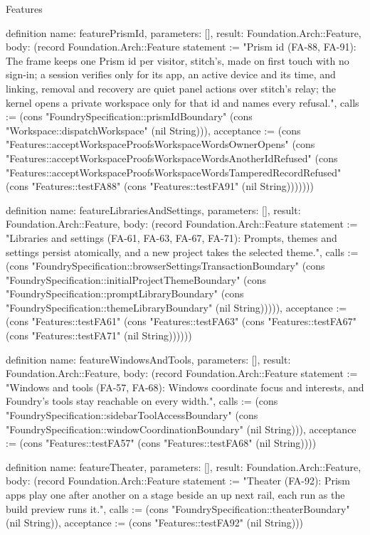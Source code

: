 \begin{lexlean}{Features}
\begin{semanticmodule}
definition{
  name: featurePrismId,
  parameters: [],
  result: Foundation.Arch::Feature,
  body: (record Foundation.Arch::Feature {statement := "Prism id (FA-88, FA-91): The frame keeps one Prism id per visitor, stitch's, made on first touch with no sign-in; a session verifies only for its app, an active device and its time, and linking, removal and recovery are quiet panel actions over stitch's relay; the kernel opens a private workspace only for that id and names every refusal.", calls := (cons "FoundrySpecification::prismIdBoundary" (cons "Workspace::dispatchWorkspace" (nil String))), acceptance := (cons "Features::acceptWorkspaceProofsWorkspaceWordsOwnerOpens" (cons "Features::acceptWorkspaceProofsWorkspaceWordsAnotherIdRefused" (cons "Features::acceptWorkspaceProofsWorkspaceWordsTamperedRecordRefused" (cons "Features::testFA88" (cons "Features::testFA91" (nil String))))))})
}

definition{
  name: featureLibrariesAndSettings,
  parameters: [],
  result: Foundation.Arch::Feature,
  body: (record Foundation.Arch::Feature {statement := "Libraries and settings (FA-61, FA-63, FA-67, FA-71): Prompts, themes and settings persist atomically, and a new project takes the selected theme.", calls := (cons "FoundrySpecification::browserSettingsTransactionBoundary" (cons "FoundrySpecification::initialProjectThemeBoundary" (cons "FoundrySpecification::promptLibraryBoundary" (cons "FoundrySpecification::themeLibraryBoundary" (nil String))))), acceptance := (cons "Features::testFA61" (cons "Features::testFA63" (cons "Features::testFA67" (cons "Features::testFA71" (nil String)))))})
}

definition{
  name: featureWindowsAndTools,
  parameters: [],
  result: Foundation.Arch::Feature,
  body: (record Foundation.Arch::Feature {statement := "Windows and tools (FA-57, FA-68): Windows coordinate focus and interests, and Foundry's tools stay reachable on every width.", calls := (cons "FoundrySpecification::sidebarToolAccessBoundary" (cons "FoundrySpecification::windowCoordinationBoundary" (nil String))), acceptance := (cons "Features::testFA57" (cons "Features::testFA68" (nil String)))})
}

definition{
  name: featureTheater,
  parameters: [],
  result: Foundation.Arch::Feature,
  body: (record Foundation.Arch::Feature {statement := "Theater (FA-92): Prism apps play one after another on a stage beside an up next rail, each run as the build preview runs it.", calls := (cons "FoundrySpecification::theaterBoundary" (nil String)), acceptance := (cons "Features::testFA92" (nil String))})
}


\end{semanticmodule}
\end{lexlean}
